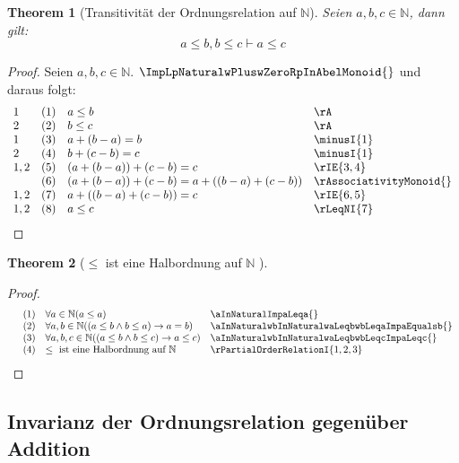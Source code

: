 \documentclass{book}
\theoremstyle{plain}
\newtheorem{theorem}{Theorem}
\theoremstyle{remark}
\theoremstyle{definition}
\begin{document}
\label{aInNaturalwbInNaturalwaLeqbwbLeqcImpaLeqc}
\begin{theorem}[Transitivität der Ordnungsrelation auf \(\mathbb{N}\)]
Seien \(a,b,c\in\mathbb{N}\), dann gilt:
\[a\leq b,b\leq c\vdash a\leq c\]
\end{theorem}
\begin{proof}
    Seien \(a,b,c\in\mathbb{N}\). \(\ImpLpNaturalwPluswZeroRpInAbelMonoid{}\) und daraus folgt:
        \[
	\begin{array}{llll}
            1       &  (1) & a\leq b & \rA \\
            2       &  (2) & b\leq c & \rA \\
            1       &  (3) & a+(b-a)=b & \minusI{1} \\
            2       &  (4) & b+(c-b)=c & \minusI{1} \\
            1,2     &  (5) & (a+(b-a))+(c-b)=c & \rIE{3,4} \\
                    &  (6) & (a+(b-a))+(c-b)=a+((b-a)+(c-b)) & \rAssociativityMonoid{} \\
            1,2     &  (7) & a+((b-a)+(c-b))=c & \rIE{6,5} \\
            1,2     &  (8) & a\leq c & \rLeqNI{7} \\
    \end{array}
	\]
\end{proof}

\label{LeqIsHalfOrderOnNaturalNumbers}
\begin{theorem}[\(\leq\) ist eine Halbordnung auf \(\mathbb{N}\) ]
\end{theorem}
\begin{proof}
        \[
	\begin{array}{llll}
                    & (1) & \forall a \in \mathbb{N}  (a \leq a) & \aInNaturalImpaLeqa{} \\
                    & (2) & \forall a, b \in \mathbb{N}  ((a \leq b \land b \leq a) \rightarrow a = b) & \aInNaturalwbInNaturalwaLeqbwbLeqaImpaEqualsb{} \\
                    & (3) & \forall a, b, c \in \mathbb{N}  ((a \leq b \land b \leq c) \rightarrow a \leq c) & \aInNaturalwbInNaturalwaLeqbwbLeqcImpaLeqc{} \\
                    & (4) & \leq \text{ ist eine Halbordnung auf } \mathbb{N} &  \rPartialOrderRelationI{1,2,3}
    \end{array}
	\]
\end{proof}

\subsection{Invarianz der Ordnungsrelation gegenüber Addition}
\end{document}
